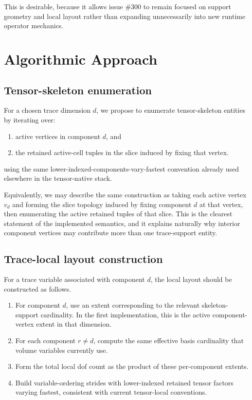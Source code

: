 \documentclass[11pt]{article}
\begin{document}
This is desirable, because it allows issue \#300 to remain focused on support geometry and local layout rather than expanding unnecessarily into new runtime operator mechanics.

\section{Algorithmic Approach}

\subsection{Tensor-skeleton enumeration}

For a chosen trace dimension $d$, we propose to enumerate tensor-skeleton entities by iterating over:
\begin{enumerate}[leftmargin=2em]
  \item active vertices in component $d$, and
  \item the retained active-cell tuples in the slice induced by fixing that vertex.
\end{enumerate}
using the same lower-indexed-components-vary-fastest convention already used elsewhere in the tensor-native stack.

Equivalently, we may describe the same construction as taking each active vertex $v_d$ and forming the slice topology induced by fixing component $d$ at that vertex, then enumerating the active retained tuples of that slice. This is the clearest statement of the implemented semantics, and it explains naturally why interior component vertices may contribute more than one trace-support entity.

\subsection{Trace-local layout construction}

For a trace variable associated with component $d$, the local layout should be constructed as follows.
\begin{enumerate}[leftmargin=2em]
  \item For component $d$, use an extent corresponding to the relevant skeleton-support cardinality. In the first implementation, this is the active component-vertex extent in that dimension.
  \item For each component $r \ne d$, compute the same effective basis cardinality that volume variables currently use.
  \item Form the total local dof count as the product of these per-component extents.
  \item Build variable-ordering strides with lower-indexed retained tensor factors varying fastest, consistent with current tensor-local conventions.
\end{enumerate}
\end{document}
